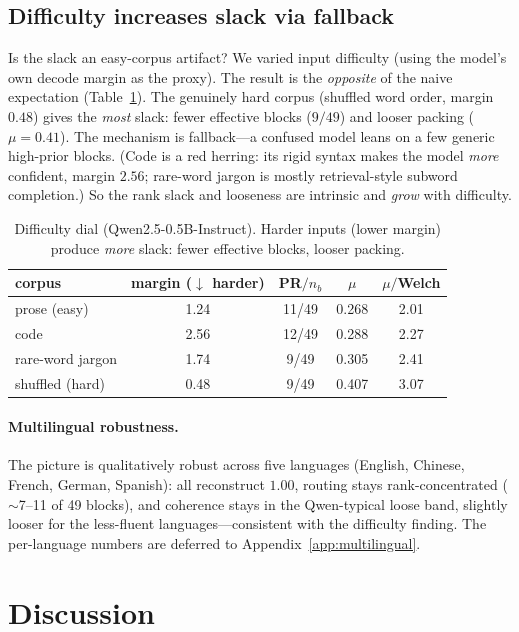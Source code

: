 \documentclass[sigconf,nonacm]{acmart}
\theoremstyle{definition}
\newcommand{\nb}{n_b}
\begin{document}
\subsection{Difficulty increases slack via fallback}
\label{sec:diffreal}
Is the slack an easy-corpus artifact? We varied input difficulty (using the model's
own decode margin as the proxy). The result is the \emph{opposite} of the naive
expectation (Table~\ref{tab:diff}). The genuinely hard corpus (shuffled word order,
margin $0.48$) gives the \emph{most} slack: fewer effective blocks ($9/49$) and
looser packing ($\mu{=}0.41$). The mechanism is fallback---a confused model leans on
a few generic high-prior blocks. (Code is a red herring: its rigid syntax makes the
model \emph{more} confident, margin $2.56$; rare-word jargon is mostly
retrieval-style subword completion.) So the rank slack and looseness are intrinsic
and \emph{grow} with difficulty.

\begin{table}[t]
\caption{Difficulty dial (Qwen2.5-0.5B-Instruct). Harder inputs (lower margin)
produce \emph{more} slack: fewer effective blocks, looser packing.}
\label{tab:diff}
\small
\begin{tabular}{lcccc}
\toprule
corpus & margin ($\downarrow$ harder) & PR$/\nb$ & $\mu$ & $\mu/$Welch \\
\midrule
prose (easy)      & 1.24 & 11/49 & 0.268 & 2.01 \\
code              & 2.56 & 12/49 & 0.288 & 2.27 \\
rare-word jargon  & 1.74 & 9/49  & 0.305 & 2.41 \\
shuffled (hard)   & 0.48 & 9/49  & 0.407 & 3.07 \\
\bottomrule
\end{tabular}
\end{table}

\paragraph{Multilingual robustness.}
The picture is qualitatively robust across five languages (English, Chinese, French,
German, Spanish): all reconstruct $1.00$, routing stays rank-concentrated
($\sim$7--11 of 49 blocks), and coherence stays in the Qwen-typical loose band,
slightly looser for the less-fluent languages---consistent with the difficulty
finding. The per-language numbers are deferred to Appendix~\ref{app:multilingual}.

\section{Discussion}
\label{sec:discussion}
\end{document}
